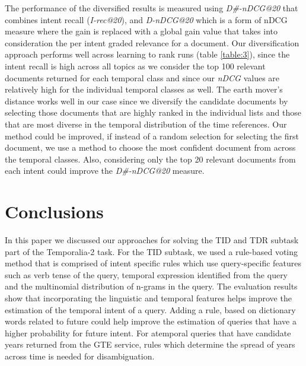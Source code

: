 \documentclass{sig-alternate}
\begin{document}
The performance of the diversified results is measured using \textit{D\#-nDCG@20} that combines intent recall (\textit{I-rec@20}), and \textit{D-nDCG@20} which is a form of nDCG measure where the gain is replaced with a global gain value that takes into consideration the per intent graded relevance for a document. Our diversification approach performs well across learning to rank runs (table \ref{table:3}), since the intent recall is high across all topics as we consider the top 100 relevant documents returned for each temporal class and since our \textit{nDCG} values are relatively high for the individual temporal classes as well. The earth mover's distance works well in our case since we diversify the candidate documents by selecting those documents that are highly ranked in the individual lists and those that are most diverse in the temporal distribution of the time references. Our method could be improved, if instead of a random selection for selecting the first document, we use a method to choose the most confident document from across the temporal classes. Also, considering only the top 20 relevant documents from each intent could improve the \textit{D\#-nDCG@20} measure.
\section{Conclusions}\label{Conclusion}
In this paper we discussed our approaches for solving the TID and TDR subtask part of the Temporalia-2 task. For the TID subtask, we used a rule-based voting method that is comprised of intent specific rules which use query-specific features such as verb tense of the query, temporal expression identified from the query and the multinomial distribution of n-grams in the query. The evaluation results show that incorporating the linguistic and temporal features helps improve the estimation of the temporal intent of a query. Adding a rule, based on dictionary words related to future could help improve the estimation of queries that have a higher probability for future intent. For atemporal queries that have candidate years returned from the GTE service, rules which determine the spread of years across time is needed for disambiguation.
\end{document}
